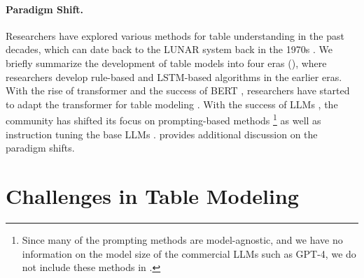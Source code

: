 \documentclass[11pt]{article}
\begin{document}
\paragraph{Paradigm Shift.}
Researchers have explored various methods for table understanding in the past decades, which can date back to the LUNAR system back in the 1970s \citep{woods1972lunar}. 
We briefly summarize the development of table models into four eras (), where researchers develop rule-based \citep{woods1972lunar, warren-pereira-1982-efficient} and LSTM-based \citep{sutskever2014sequence} algorithms \citep{zhong2018seqsql} in the earlier eras.
With the rise of transformer \citep{vaswani2017attention} and the success of BERT \citep{devlin-etal-2019-bert}, researchers have started to adapt the transformer for table modeling \citep{herzig-etal-2020-tapas,yin-etal-2020-tabert,yu2021grappa,shi2021learning,yang-etal-2022-tableformer}. 
With the success of LLMs \citep{ouyang2022training}, the community has shifted its focus on prompting-based methods \citep{chang2023prompt, deng-etal-2024-tables}\footnote{Since many of the prompting methods are model-agnostic, and we have no information on the model size of the commercial LLMs such as GPT-4, we do not include these methods in .} as well as instruction tuning the base LLMs \citep{li2023table, zhang-etal-2024-tablellama, zheng-etal-2024-multimodal, zhang2024tablellm}.
 provides additional discussion on the paradigm shifts.


\section{Challenges in Table Modeling}
\label{subsec: challenges-table-modeling}
\end{document}
